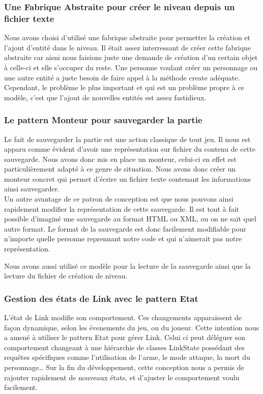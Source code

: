 \documentclass[a4paper,11pt]{article}
\begin{document}
\subsubsection*{Une Fabrique Abstraite pour créer le niveau depuis un fichier
texte}
Nous avons choisi d'utilisé une fabrique abstraite pour permettre la
création et l'ajout d'entité dans le niveau. Il était assez interressant
de créer cette fabrique abstraite car aisni nous faisions juste une
demande de création d'un certain objet à celle-ci et elle s'occuper du
reste. Une personne voulant créer un personnage ou une autre entité a
juste besoin de faire appel à la méthode create adéquate. Cependant, le
problème le plus important et qui est un problème propre à ce modèle,
c'est que l'ajout de nouvelles entités est assez fastidieux.

\begin{center}
\end{center}

\subsubsection*{Le pattern Monteur pour sauvegarder la partie}
Le fait de sauvegarder la partie est une action classique de tout
jeu. Il nous est apparu comme évident d'avoir une représentation sur
fichier du contenu de cette sauvegarde. Nous avons donc mis en place un
monteur, celui-ci en effet est particulièrement adapté à ce genre de
situation. Nous avons donc créer un monteur concret qui permet d'écrire
un fichier texte contenant les informations ainsi sauvegarder.\\
Un autre avantage de ce patron de conception est que nous pouvons ainsi
rapidement modifier la représentation de cette sauvegarde. Il est tout à
fait possible d'imaginé une sauvegarde au format HTML ou XML, ou on ne
sait quel autre format. Le format de la sauvegarde est donc facilement
modifiable pour n'importe quelle personne reprennant notre code et qui
n'aimerait pas notre représentation. \\

\begin{center}
\end{center}

Nous avons aussi utilisé ce modèle pour la lecture de la sauvegarde
ainsi que la lecture du fichier de création de niveau.

\subsubsection*{Gestion des états de Link avec le pattern Etat}
L'état de Link modifie son comportement. Ces changements
apparaissent de façon dynamique, selon les évenements du jeu, ou du joueur.
Cette intention nous a amené à utiliser le pattern Etat pour gérer Link. Celui
ci peut déléguer son comportement changeant à une hiérarchie de classes
LinkState possédant des requêtes spécifiques comme l'utilisation de l'arme, le
mode attaque, la mort du personnage\ldots
Sur la fin du développement, cette conception nous a permis de rajouter
rapidement de nouveaux états, et d'ajuster le comportement voulu facilement. \\
\end{document}
